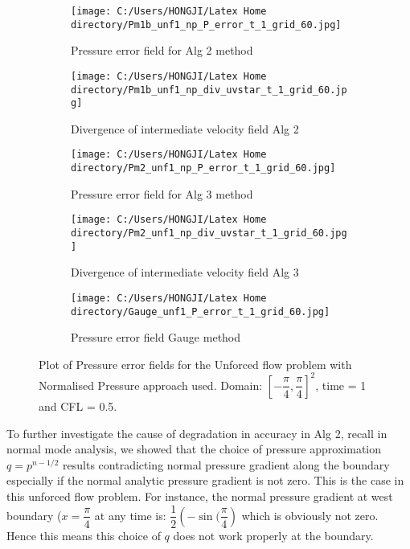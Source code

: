 \begin{figure}[H]
	\centering
	\begin{subfigure}[t]{2.2in}
		\centering
		\texttt{[image: C:/Users/HONGJI/Latex Home directory/Pm1b\_unf1\_np\_P\_error\_t\_1\_grid\_60.jpg]}
		\caption{Pressure error field for Alg 2 method}\label{fig:6.19a}		
	\end{subfigure}
	\quad
	\begin{subfigure}[t]{2.6in}
		\centering
		\texttt{[image: C:/Users/HONGJI/Latex Home directory/Pm1b\_unf1\_np\_div\_uvstar\_t\_1\_grid\_60.jpg]}
		\caption{Divergence of intermediate velocity field Alg 2}\label{fig:6.19b}
	\end{subfigure}
	\quad
	\centering
	\begin{subfigure}[t]{2.2in}
		\centering
		\texttt{[image: C:/Users/HONGJI/Latex Home directory/Pm2\_unf1\_np\_P\_error\_t\_1\_grid\_60.jpg]}
		\caption{Pressure error field for Alg 3 method}\label{fig:6.19a}		
	\end{subfigure}
	\quad
	\begin{subfigure}[t]{2.5in}
		\centering
		\texttt{[image: C:/Users/HONGJI/Latex Home directory/Pm2\_unf1\_np\_div\_uvstar\_t\_1\_grid\_60.jpg]}
		\caption{Divergence of intermediate velocity field Alg 3}\label{fig:6.19b}
	\end{subfigure}
	\quad
	\begin{subfigure}[t]{2.5in}
		\centering
		\texttt{[image: C:/Users/HONGJI/Latex Home directory/Gauge\_unf1\_P\_error\_t\_1\_grid\_60.jpg]}
		\caption{Pressure error field Gauge method }\label{fig:6.19b}
	\end{subfigure}
	\caption{Plot of Pressure error fields for the Unforced flow problem with Normalised Pressure approach used. Domain: $[-\dfrac{\pi}{4}, \dfrac{\pi}{4}]^2$, time = 1 and CFL = 0.5.}\label{fig:6.16}
\end{figure}

To further investigate the cause of degradation in accuracy in Alg 2, recall in normal mode analysis, we showed that the choice of pressure approximation $q = p^{n-1/2}$ results contradicting normal pressure gradient along the boundary especially if the normal analytic pressure gradient is not zero. This is the case in this unforced flow problem. For instance, the normal pressure gradient at west boundary ($x=\dfrac{\pi}{4}$ at any time is: $\dfrac{1}{2}\left(-\sin(\dfrac{\pi}{4}\right)$ which is obviously not zero. Hence this means this choice of $q$ does not work properly at the boundary.\\

